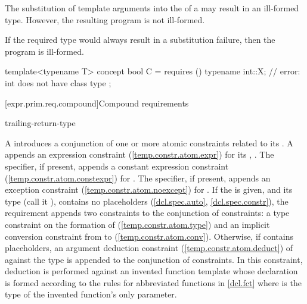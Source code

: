 \pnum
The substitution of template arguments into the
 of a
 may result
in an ill-formed type. However, the resulting program is not 
ill-formed. 

\pnum
If the required type would always result in a substitution failure,
then the program is ill-formed.
\enterexample
\begin{codeblock}
template<typename T> concept bool C =
  requires () {
    typename int::X;  // error: int does not have class type
  };
\end{codeblock}
\exitexample




[expr.prim.req.compound]{Compound requirements}
      

\begin{bnf}
\br
    \opt {} \opt trailing-return-type\opt \terminal{;}
\end{bnf}

\pnum
A  introduces 
a conjunction of one or more atomic constraints related to its
.
% 
A  appends
an expression constraint (\ref{temp.constr.atom.expr})
for its ,
.
% 
The  specifier, if present, appends a constant 
expression constraint (\ref{temp.constr.atom.constexpr}) 
for .
% 
The  specifier, if present, appends an exception 
constraint (\ref{temp.constr.atom.noexcept}) for 
.
% 
If the  is
given, and its type (call it ), contains no placeholders
(\ref{dcl.spec.auto}, \ref{dcl.spec.constr}),
the requirement appends two constraints to the conjunction of 
constraints: 
% 
a type constraint on the formation of 
(\ref{temp.constr.atom.type}) and
% 
an implicit conversion constraint from  to 
(\ref{temp.constr.atom.conv}).
% 
Otherwise, if  contains placeholders, an argument deduction 
constraint (\ref{temp.constr.atom.deduct})
of  against the type 
is appended to the conjunction of constraints. 
% 
In this constraint, deduction is performed against an invented function
template whose declaration is formed according to the rules for
abbreviated functions in \ref{dcl.fct} where 
 is the type of the invented function's only parameter.


